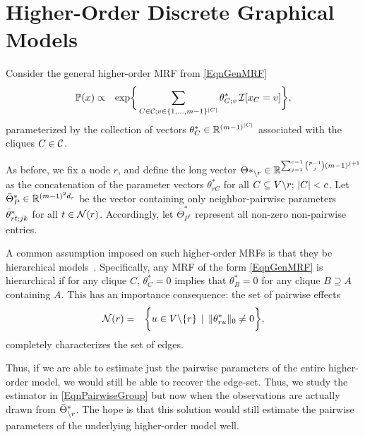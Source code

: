 \section{Higher-Order Discrete Graphical Models}\label{SecHigherOrder}

Consider the general higher-order MRF from \eqref{EqnGenMRF}
\begin{align*}
\mathbb{P}(x) & \propto & \exp \biggr \{\sum_{C \in \mathcal{C}; v \in \{1, \ldots, m-1 \}^{|C|}} \theta^*_{C;v} \, \mathcal{I}[x_C = v] \biggr \},
\end{align*}
parameterized by the collection of vectors $\theta^*_{C} \in \mathbb{R}^{(m-1)^{|C|}}$ associated with the cliques $C \in \mathcal{C}$. 

As before, we fix a node $r$, and define the long vector $\Theta*_{\backslash r} \in \mathbb{R}^{\sum_{j=1}^{c-1} \binom{p-1}{j} (m-1)^{j+1}}$ as the concatenation of the parameter vectors $\theta^*_{rC}$ for all $C \subseteq V \backslash r;\, |C| < c$. Let $\bar{\Theta}^*_P\in\mathbb{R}^{(m-1)^2 d_{r}}$ be the vector containing only neighbor-pairwise parameters $\bar{\theta}^*_{r t;jk}$ for all $t\in\mathcal{N}(r)$. Accordingly, let $\bar{\Theta}^*_{P^c}$ represent all non-zero non-pairwise entries.

 A common assumption imposed on such higher-order MRFs is that they be hierarchical models~\citep{Lauritzen}. Specifically, any MRF of the form \eqref{EqnGenMRF} is hierarchical if for any clique $C$, $\theta^*_{C} = 0$ implies that  $\theta^*_{B} = 0$ for any clique $B \supseteq A$ containing $A$. This has an importance consequence: the set of pairwise effects 
\begin{eqnarray*}
\mathcal{N}(r) & = & \biggr \{ u \in V \backslash \{r\} \, \mid
\, \|\theta^*_{r u}\|_0 \neq 0 \biggr \},
\end{eqnarray*}
completely characterizes the set of edges. 


Thus, if we are able to estimate just the pairwise parameters of the entire higher-order model, we would still be able to recover the edge-set. Thus, we study the 
estimator in \eqref{EqnPairwiseGroup} but now when the observations are actually drawn from $\bar{\Theta}^*_{\backslash r}$. The hope is that this solution would still estimate the  pairwise parameters of the underlying higher-order model well. 

